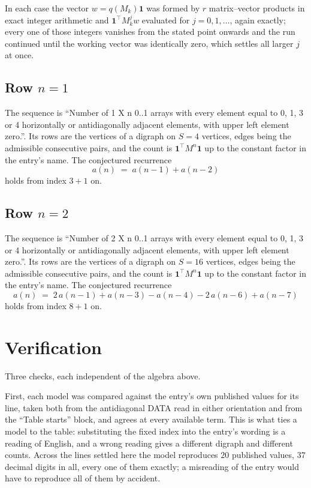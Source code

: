 \documentclass[11pt,a4paper]{article}
\theoremstyle{plain}
\theoremstyle{definition}
\begin{document}
In each case the vector $w=q(M_k)\mathbf{1}$ was formed by $r$ matrix--vector products in
exact integer arithmetic and $\mathbf{1}^{\!\top}M_k^{j}w$ evaluated for $j=0,1,\dots$,
again exactly; every one of those integers vanishes from the stated point onwards and the run
continued until the working vector was identically zero, which settles all larger $j$ at once.

\subsection*{Row $n$$=1$}
The sequence is ``Number of 1 X n 0..1 arrays with every element equal to 0, 1, 3 or 4 horizontally or antidiagonally adjacent elements, with upper left element zero.''. Its rows are the vertices of a digraph on
$S=4$ vertices, edges being the admissible consecutive pairs, and the count is
$\mathbf{1}^{\!\top}M^{n}\mathbf{1}$ up to the constant factor in the entry's name.
The conjectured recurrence
\[
a(n)\;=\;a(n-1) + a(n-2)
\]
holds from index $3+1$ on.

\subsection*{Row $n$$=2$}
The sequence is ``Number of 2 X n 0..1 arrays with every element equal to 0, 1, 3 or 4 horizontally or antidiagonally adjacent elements, with upper left element zero.''. Its rows are the vertices of a digraph on
$S=16$ vertices, edges being the admissible consecutive pairs, and the count is
$\mathbf{1}^{\!\top}M^{n}\mathbf{1}$ up to the constant factor in the entry's name.
The conjectured recurrence
\[
a(n)\;=\;2\,a(n-1) + a(n-3) - a(n-4) - 2\,a(n-6) + a(n-7)
\]
holds from index $8+1$ on.

\section{Verification}

Three checks, each independent of the algebra above.

First, each model was compared against the entry's own published values for its line, taken
both from the antidiagonal DATA read in either orientation and from the ``Table starts''
block, and agrees at every available term. This is what ties a model to the table:
substituting the fixed index into the entry's wording is a reading of English, and a wrong
reading gives a different digraph and different counts. Across the lines settled here the
model reproduces $20$ published values, $37$ decimal digits in all, every one of
them exactly; a misreading of the entry would have to reproduce all of them by accident.
\end{document}
